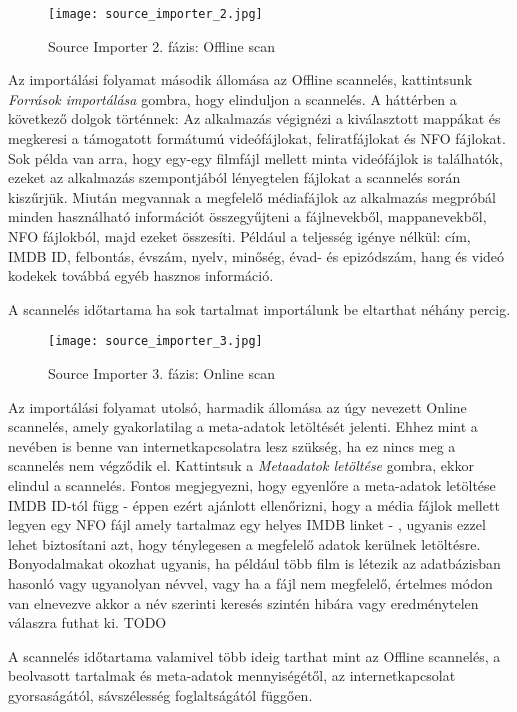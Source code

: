 \begin{figure}[H]
	\centering
	\texttt{[image: source\_importer\_2.jpg]}
	\caption{Source Importer 2. fázis: Offline scan}
	\label{fig:source_importer_2}
\end{figure}
Az importálási folyamat második állomása az Offline scannelés, kattintsunk {\it Források importálása} gombra, hogy elinduljon a scannelés. A háttérben a következő dolgok történnek: Az alkalmazás végignézi a kiválasztott mappákat és megkeresi a támogatott formátumú videófájlokat, feliratfájlokat és NFO fájlokat. Sok példa van arra, hogy egy-egy filmfájl mellett minta videófájlok is találhatók, ezeket az alkalmazás szempontjából lényegtelen fájlokat a scannelés során kiszűrjük. Miután megvannak a megfelelő médiafájlok az alkalmazás megpróbál minden használható információt összegyűjteni a fájlnevekből, mappanevekből, NFO fájlokból, majd ezeket összesíti. Például a teljesség igénye nélkül: cím, IMDB ID, felbontás, évszám, nyelv, minőség, évad- és epizódszám, hang és videó kodekek továbbá egyéb hasznos információ.

A scannelés időtartama ha sok tartalmat importálunk be eltarthat néhány percig.

\begin{figure}[H]
	\centering
	\texttt{[image: source\_importer\_3.jpg]}
	\caption{Source Importer 3. fázis: Online scan}
	\label{fig:source_importer_3}
\end{figure}
Az importálási folyamat utolsó, harmadik állomása az úgy nevezett Online scannelés, amely gyakorlatilag a meta-adatok letöltését jelenti. Ehhez mint a nevében is benne van internetkapcsolatra lesz szükség, ha ez nincs meg a scannelés nem végződik el. Kattintsuk a {\it Metaadatok letöltése} gombra, ekkor elindul a scannelés. Fontos megjegyezni, hogy egyenlőre a meta-adatok letöltése IMDB ID-tól függ - éppen ezért ajánlott ellenőrizni, hogy a média fájlok mellett legyen egy NFO fájl amely tartalmaz egy helyes IMDB linket - , ugyanis ezzel lehet biztosítani azt, hogy ténylegesen a megfelelő adatok kerülnek letöltésre. Bonyodalmakat okozhat ugyanis, ha például több film is létezik az adatbázisban hasonló vagy ugyanolyan névvel, vagy ha a fájl nem megfelelő, értelmes módon van elnevezve akkor a név szerinti keresés szintén hibára vagy eredménytelen válaszra futhat ki.
TODO

A scannelés időtartama valamivel több ideig tarthat mint az Offline scannelés, a beolvasott tartalmak és meta-adatok mennyiségétől, az internetkapcsolat gyorsaságától, sávszélesség foglaltságától függően.

